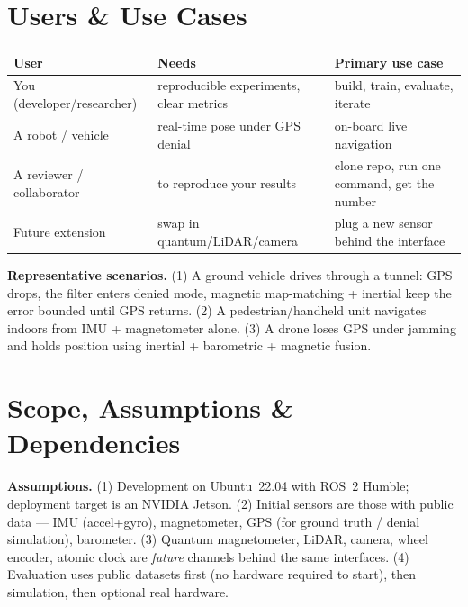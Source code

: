 \documentclass[11pt]{article}
\begin{document}
\section{Users \& Use Cases}\label{sec:users}

\begin{center}\footnotesize
\begin{tabular}{@{}p{3.0cm}p{4.6cm}p{4.6cm}@{}}
\toprule
\textbf{User} & \textbf{Needs} & \textbf{Primary use case}\\
\midrule
You (developer/researcher) & reproducible experiments, clear metrics & build, train, evaluate, iterate\\
A robot / vehicle & real-time pose under GPS denial & on-board live navigation\\
A reviewer / collaborator & to reproduce your results & clone repo, run one command, get the number\\
Future extension & swap in quantum/LiDAR/camera & plug a new sensor behind the interface\\
\bottomrule
\end{tabular}
\end{center}

\textbf{Representative scenarios.} (1) A ground vehicle drives through a tunnel: GPS drops, the
filter enters denied mode, magnetic map-matching + inertial keep the error bounded until GPS
returns. (2) A pedestrian/handheld unit navigates indoors from IMU + magnetometer alone.
(3) A drone loses GPS under jamming and holds position using inertial + barometric + magnetic
fusion.

\section{Scope, Assumptions \& Dependencies}\label{sec:scope}

\begin{defbox}
\textbf{Assumptions.} (1) Development on Ubuntu~22.04 with ROS~2 Humble; deployment target is an
NVIDIA Jetson. (2) Initial sensors are those with public data --- IMU (accel+gyro),
magnetometer, GPS (for ground truth / denial simulation), barometer. (3) Quantum magnetometer,
LiDAR, camera, wheel encoder, atomic clock are \emph{future} channels behind the same
interfaces. (4) Evaluation uses public datasets first (no hardware required to start), then
simulation, then optional real hardware.
\end{defbox}
\end{document}
